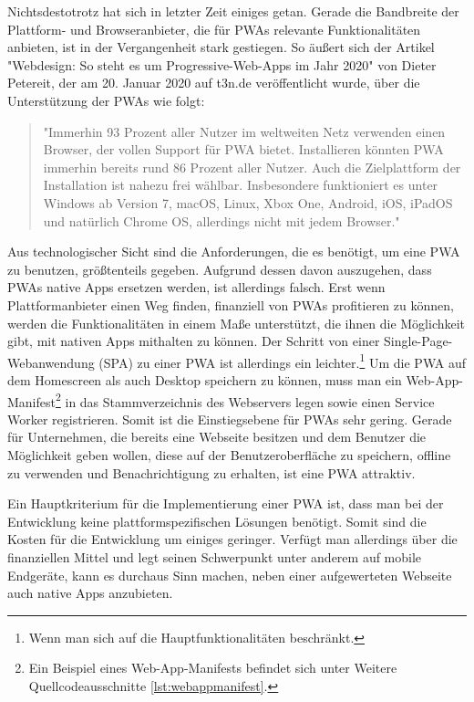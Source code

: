 Nichtsdestotrotz hat sich in letzter Zeit einiges getan.
Gerade die Bandbreite der Plattform- und Browseranbieter, die für PWAs relevante
Funktionalitäten anbieten, ist in der Vergangenheit stark gestiegen. So äußert sich der Artikel
"Webdesign: So steht es um Progressive-Web-Apps im Jahr 2020" von Dieter Petereit,
der am 20. Januar 2020 auf t3n.de veröffentlicht wurde, über die Unterstützung der PWAs wie folgt:

\begin{quote}
"Immerhin 93 Prozent aller Nutzer im weltweiten Netz verwenden einen Browser, der vollen Support
für PWA bietet. Installieren könnten PWA immerhin bereits rund 86 Prozent aller Nutzer. Auch
die Zielplattform der Installation ist nahezu frei wählbar. Insbesondere funktioniert es
unter Windows ab Version 7, macOS, Linux, Xbox One, Android, iOS, iPadOS und natürlich Chrome OS,
allerdings nicht mit jedem Browser."\cite{T3NPWASupport}
\end{quote}

Aus technologischer Sicht sind die
Anforderungen, die es benötigt, um eine PWA zu benutzen, größtenteils gegeben.
Aufgrund dessen davon auszugehen, dass PWAs native Apps ersetzen werden, ist allerdings
falsch. Erst wenn Plattformanbieter einen Weg finden, finanziell von PWAs profitieren
zu können, werden die Funktionalitäten in einem Maße unterstützt, die ihnen die Möglichkeit
gibt, mit nativen Apps mithalten zu können. Der Schritt von einer Single-Page-Webanwendung (SPA) zu einer
PWA ist allerdings ein leichter.\footnote{Wenn man sich auf die Hauptfunktionalitäten beschränkt.}
Um die PWA auf dem Homescreen als auch Desktop speichern zu können, muss man ein Web-App-Manifest\footnote{
Ein Beispiel eines Web-App-Manifests befindet sich unter Weitere Quellcodeausschnitte \ref{lst:webappmanifest}.}
in das Stammverzeichnis des Webservers legen sowie einen Service Worker registrieren.
Somit ist die Einstiegsebene für PWAs sehr gering. Gerade für Unternehmen,
die bereits eine Webseite besitzen und dem Benutzer die Möglichkeit geben wollen,
diese auf der Benutzeroberfläche zu speichern, offline zu verwenden und Benachrichtigung zu erhalten,
ist eine PWA attraktiv.

Ein Hauptkriterium für die Implementierung einer PWA ist, dass man bei der Entwicklung
keine plattformspezifischen Lösungen benötigt. Somit sind die Kosten für die Entwicklung um einiges
geringer. Verfügt man allerdings über die finanziellen Mittel und legt seinen Schwerpunkt unter anderem
auf mobile Endgeräte, kann es durchaus Sinn machen, neben einer aufgewerteten Webseite
auch native Apps anzubieten.

